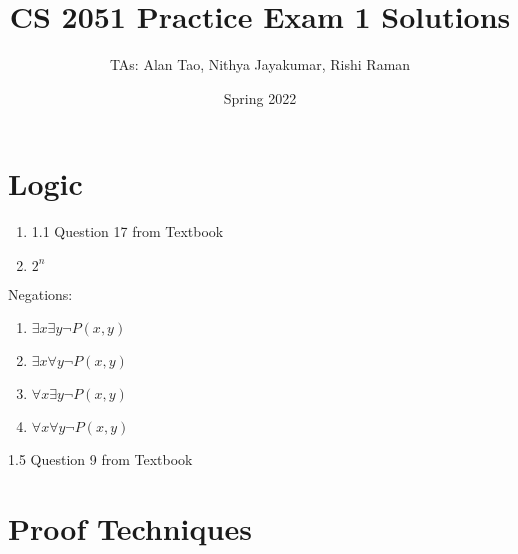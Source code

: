 \documentclass{article}
\title{CS 2051 Practice Exam 1 Solutions}
\author {TAs: Alan Tao, Nithya Jayakumar, Rishi Raman}
\date{Spring 2022}
\begin{document}
    \maketitle
    \section{Logic}
    \begin{enumerate}
    \item 1.1 Question 17 from Textbook
    \item $2^n$
    \end{enumerate}
    Negations: \\
    \begin{enumerate}
        \item $\exists x \exists y \neg P(x,y)$
        \item $\exists x \forall y \neg P(x,y)$
        \item $\forall x \exists y \neg P(x,y)$
        \item $\forall x \forall y \neg P(x,y)$
    \end{enumerate}
    1.5 Question 9 from Textbook
    \section{Proof Techniques}
		
\end{document}
